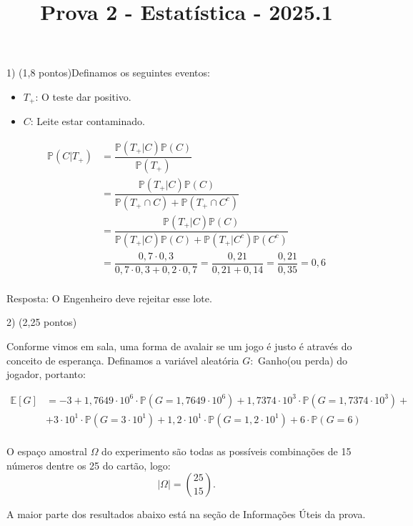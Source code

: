 \documentclass[12pt]{article}
\title{Prova 2 - Estatística - 2025.1}
\begin{document}
\date{}
\maketitle

1) (1,8 pontos)Definamos os seguintes eventos:

\begin{itemize}
    \item $T_{+}$: O teste dar positivo. 
    \item $C$: Leite estar contaminado.
\end{itemize}

\begin{align*}
    \mathds{P}(C|T_{+}) &= \dfrac{\mathds{P}(T_{+}|C) \mathds{P}(C) }{\mathds{P}(T_{+})}\\
    &= \dfrac{\mathds{P}(T_{+}|C) \mathds{P}(C) }{\mathds{P}(T_{+} \cap C) +\mathds{P}(T_{+} \cap C^c) }\\
    &= \dfrac{\mathds{P}(T_{+}|C) \mathds{P}(C) }{\mathds{P}(T_{+}|C) \mathds{P}(C) + \mathds{P}(T_{+}|C^c) \mathds{P}(C^c) }\\
    &= \dfrac{0,7 \cdot 0,3}{0,7 \cdot 0,3 + 0,2 \cdot 0,7 } = \dfrac{0,21}{0,21 + 0,14} = \dfrac{0,21}{0,35}= 0,6\\
\end{align*}

Resposta: O Engenheiro deve rejeitar esse lote. 

2) (2,25 pontos) 

Conforme vimos em sala, uma forma de avalair se um jogo é justo é através do conceito de esperança. Definamos a variável aleatória $G:$ Ganho(ou perda) do jogador, portanto:

\begin{align*}
    \mathds{E}[G] &= -3 + 1,7649 \cdot 10^6 \cdot \mathds{P}(G= 1,7649 \cdot 10^6)  + 1,7374 \cdot 10^3 \cdot \mathds{P}(G= 1,7374 \cdot 10^3) +\\ 
    &+ 3 \cdot 10^1 \cdot  \mathds{P}(G=  3 \cdot 10^1)  + 1,2 \cdot 10^1 \cdot  \mathds{P}(G=  1,2 \cdot 10^1) + 6  \cdot  \mathds{P}(G=  6)\\ 
\end{align*}

O espaço amostral $\Omega$ do experimento são todas as possíveis combinações de 15 números dentre os 25 do cartão, logo:
$$|\Omega| = \binom{25}{15}.$$

A maior parte dos resultados abaixo está na seção de Informações Úteis da prova. 
\end{document}
